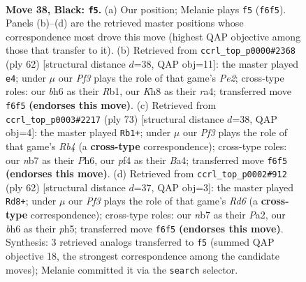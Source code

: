 \documentclass[11pt]{article}
\begin{document}
\clearpage

\begin{figure}[p]\centering
\begin{subfigure}{0.46\textwidth}\centering
\resizebox{\linewidth}{!}{%
\newchessgame
\chessboard[
  setfen={7k/1N4Rp/5ppB/8/5P1P/3P4/P1P2PK1/8 b - - 0 38},
  showmover=false,
  pgfstyle=straightmove, color=movearrow, markmove={f6-f5}
]}
\caption{}
\end{subfigure}\hfill
\begin{subfigure}{0.46\textwidth}\centering
\resizebox{\linewidth}{!}{%
\newchessgame
\chessboard[
  setfen={8/p3pk2/2b2p2/7p/rBP4P/5P2/4PK2/1R6 w - - 3 32},
  showmover=false,
  pgfstyle=straightmove, color=movearrow, markmove={e2-e4}
]}
\caption{}
\end{subfigure}
\\[4pt]
\begin{subfigure}{0.46\textwidth}\centering
\resizebox{\linewidth}{!}{%
\newchessgame
\chessboard[
  setfen={6k1/5p2/5Rpp/1r6/b7/2B1PPP1/7P/6K1 b - - 1 37},
  showmover=false,
  pgfstyle=straightmove, color=movearrow, markmove={b5-b1}
]}
\caption{}
\end{subfigure}\hfill
\begin{subfigure}{0.46\textwidth}\centering
\resizebox{\linewidth}{!}{%
\newchessgame
\chessboard[
  setfen={6k1/pp5p/2pR4/7p/2P4r/1P2K3/P6P/8 w - - 2 32},
  showmover=false,
  pgfstyle=straightmove, color=movearrow, markmove={d6-d8}
]}
\caption{}
\end{subfigure}
\caption{\textbf{Move 38, Black: \texttt{f5}.} (a) Our position; Melanie plays \texttt{f5} (\texttt{f6f5}). Panels (b)--(d) are the retrieved master positions whose correspondence most drove this move (highest QAP objective among those that transfer to it). (b) Retrieved from \texttt{ccrl\_top\_p0000\#2368} (ply 62) [structural distance $d$=38, QAP obj=11]: the master played \texttt{e4}; under $\mu$ our \emph{Pf3} plays the role of that game's \emph{Pe2}; cross-type roles: our \emph{b}h6 as their \emph{R}b1, our \emph{K}h8 as their \emph{r}a4; transferred move \texttt{f6f5} \textbf{(endorses this move)}. (c) Retrieved from \texttt{ccrl\_top\_p0003\#2217} (ply 73) [structural distance $d$=38, QAP obj=4]: the master played \texttt{Rb1+}; under $\mu$ our \emph{Pf3} plays the role of that game's \emph{Rb4} (a \textbf{cross-type} correspondence); cross-type roles: our \emph{n}b7 as their \emph{P}h6, our \emph{p}f4 as their \emph{B}a4; transferred move \texttt{f6f5} \textbf{(endorses this move)}. (d) Retrieved from \texttt{ccrl\_top\_p0002\#912} (ply 62) [structural distance $d$=37, QAP obj=3]: the master played \texttt{Rd8+}; under $\mu$ our \emph{Pf3} plays the role of that game's \emph{Rd6} (a \textbf{cross-type} correspondence); cross-type roles: our \emph{n}b7 as their \emph{P}a2, our \emph{b}h6 as their \emph{p}h5; transferred move \texttt{f6f5} \textbf{(endorses this move)}. Synthesis: 3 retrieved analogs transferred to \texttt{f5} (summed QAP objective 18, the strongest correspondence among the candidate moves); Melanie committed it via the \texttt{search} selector.}
\label{fig:thought-m75}
\end{figure}
\end{document}
